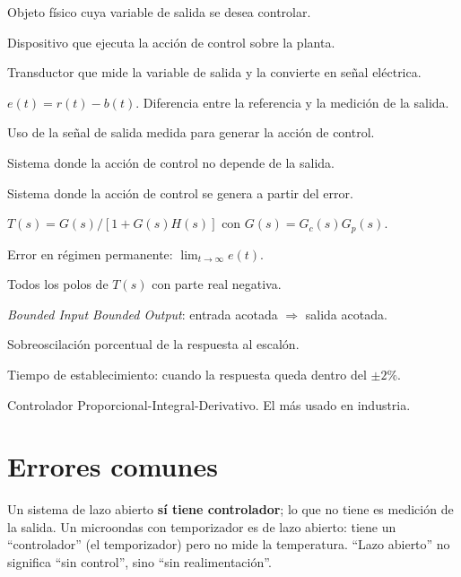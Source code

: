 \begin{conceptosclave}
\begin{description}[leftmargin=5.5em, labelwidth=5em, font=\bfseries\color{colkey}]
  \item[Planta]        Objeto físico cuya variable de salida se desea controlar.
  \item[Actuador]      Dispositivo que ejecuta la acción de control sobre la planta.
  \item[Sensor]        Transductor que mide la variable de salida y la convierte en señal eléctrica.
  \item[Error] $e(t) = r(t) - b(t)$. Diferencia entre la referencia y la medición de la salida.
  \item[Realim.] Uso de la señal de salida medida para generar la acción de control.
  \item[Lazo abierto]  Sistema donde la acción de control no depende de la salida.
  \item[Lazo cerrado]  Sistema donde la acción de control se genera a partir del error.
  \item[FT lazo cerr.] $T(s) = G(s)/[1+G(s)H(s)]$ con $G(s) = G_c(s)G_p(s)$.
  \item[$e_{ss}$]      Error en régimen permanente: $\lim_{t\to\infty}e(t)$.
  \item[Estabilidad]   Todos los polos de $T(s)$ con parte real negativa.
  \item[BIBO]          \textit{Bounded Input Bounded Output}: entrada acotada $\Rightarrow$ salida acotada.
  \item[$M_p$]         Sobreoscilación porcentual de la respuesta al escalón.
  \item[$t_s$]         Tiempo de establecimiento: cuando la respuesta queda dentro del $\pm 2\%$.
  \item[PID]           Controlador Proporcional-Integral-Derivativo. El más usado en industria.
\end{description}
\end{conceptosclave}

\section{Errores comunes}
\label{sec:intro-errores}

\begin{errorcomon}
  Un sistema de lazo abierto \textbf{sí tiene controlador}; lo que no tiene
  es medición de la salida. Un microondas con temporizador es de lazo abierto:
  tiene un ``controlador'' (el temporizador) pero no mide la temperatura.
  ``Lazo abierto'' no significa ``sin control'', sino ``sin realimentación''.
\end{errorcomon}

